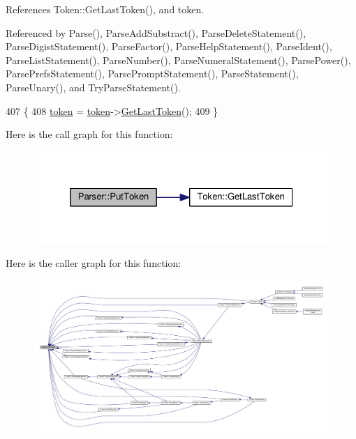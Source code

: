 References Token\+::\+Get\+Last\+Token(), and token.



Referenced by Parse(), Parse\+Add\+Substract(), Parse\+Delete\+Statement(), Parse\+Digist\+Statement(), Parse\+Factor(), Parse\+Help\+Statement(), Parse\+Ident(), Parse\+List\+Statement(), Parse\+Number(), Parse\+Numeral\+Statement(), Parse\+Power(), Parse\+Prefs\+Statement(), Parse\+Prompt\+Statement(), Parse\+Statement(), Parse\+Unary(), and Try\+Parse\+Statement().


\begin{DoxyCode}
407 \{
408     \hyperlink{classParser_a467028559d31c5b33f16ca8be56715cc}{token} = \hyperlink{classParser_a467028559d31c5b33f16ca8be56715cc}{token}->\hyperlink{structToken_af5213b25192a01f526143461ab47e6af}{GetLastToken}();
409 \}
\end{DoxyCode}


Here is the call graph for this function\+:\nopagebreak
\begin{figure}[H]
\begin{center}
\leavevmode
\includegraphics[width=320pt]{classParser_adb5c3a188b36f7ecb198ae30f06338b3_cgraph}
\end{center}
\end{figure}




Here is the caller graph for this function\+:\nopagebreak
\begin{figure}[H]
\begin{center}
\leavevmode
\includegraphics[width=350pt]{classParser_adb5c3a188b36f7ecb198ae30f06338b3_icgraph}
\end{center}
\end{figure}


